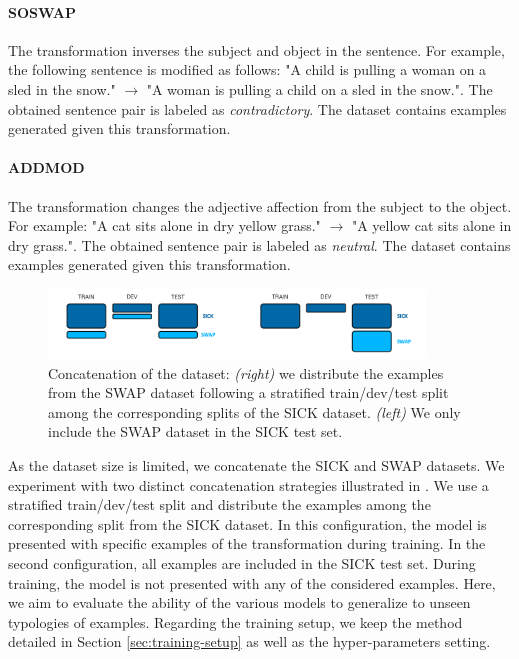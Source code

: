 \paragraph{SOSWAP} The transformation inverses the subject and object in the sentence. For example, the following sentence is modified as follows: "A child is pulling  a woman on a sled in the snow." $\rightarrow$ "A woman is pulling a child on a sled in the snow.". The obtained sentence pair is labeled as \textit{contradictory}. The dataset contains  examples generated given this transformation.

\paragraph{ADDMOD}  The transformation changes the adjective affection from the subject to the object. For example: "A cat sits  alone in dry yellow grass." $\rightarrow$ "A yellow cat sits alone in dry grass.". The obtained sentence pair is labeled as \textit{neutral}. The dataset contains  examples generated given this transformation.

\begin{figure}[!htb]
\begin{center}
\includegraphics[width=10cm]{images/swap-split.png}
\end{center}
\caption{Concatenation of the dataset: \textit{(right)} we distribute the examples from the SWAP dataset following a stratified train/dev/test split among the corresponding splits of the SICK dataset. \textit{(left)} We only include the SWAP dataset in the SICK test set.}
\end{figure}

As the dataset size is limited, we concatenate the SICK and SWAP datasets. We experiment with two distinct concatenation strategies illustrated in . We use a stratified train/dev/test split and distribute the examples among the corresponding split from the SICK dataset. In this configuration, the model is presented with specific examples of the transformation during training. In the second configuration, all examples are included in the SICK test set. During training, the model is not presented with any of the considered examples. Here, we aim to evaluate the ability of the various models to generalize to unseen typologies of examples. Regarding the training setup, we keep the method detailed in Section \ref{sec:training-setup} as well as the hyper-parameters setting.

